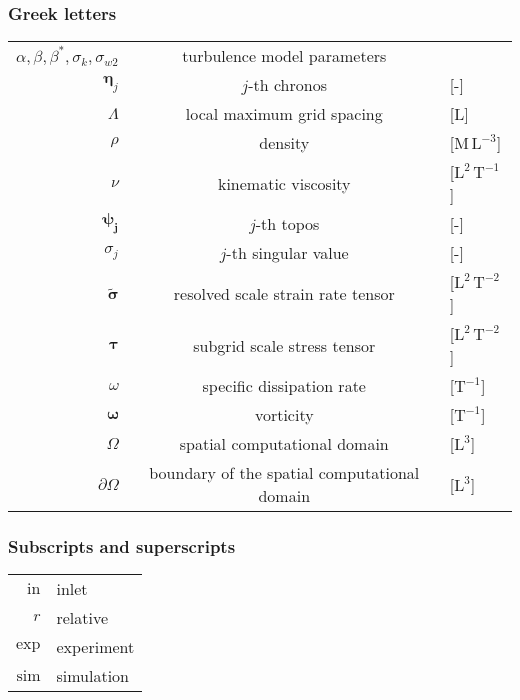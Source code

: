     \subsubsection*{Greek letters}
    \begin{tabular}{ rcl }
    $\alpha, {\beta}, \beta^*, \sigma_k, \sigma_{w2}$ & turbulence model parameters &\, \\
    $\bm{\eta}_j$ & $j$-th chronos & [-] \\
    $\Lambda$ & local maximum grid spacing & [{$\mathrm{L}$}] \\
    $\rho$ & density & [{$\mathrm{M\,L^{-3}}$}] \\
    $\nu$ & kinematic viscosity & [{$\mathrm{L^2\,T^{-1}}$}] \\
    ${\bm{\psi_j}}$ & $j$-th topos & [-] \\
    ${{\sigma_j}}$ & $j$-th singular value & [-] \\
    $\bm{\tilde{\sigma}}$ & resolved scale strain rate tensor & [$\mathrm{L^{2}\,T^{-2}}$] \\
    $\bm{{\tau}}$ & subgrid scale stress tensor & [$\mathrm{L^{2}\,T^{-2}}$] \\
    ${\omega}$ & specific dissipation rate & [$\mathrm{T^{-1}}$] \\
    $\bm{\omega}$ & vorticity & [$\mathrm{T^{-1}}$] \\
    ${\Omega}$ & spatial computational domain & [$\mathrm{L^{3}}$] \\
    ${\partial\Omega}$ & boundary of the spatial computational domain & [$\mathrm{L^{3}}$] \\
    \end{tabular}
    
\subsubsection*{Subscripts and superscripts}
\begin{tabular}{ rl}
    $\mathrm{in}$ & inlet \\
    $r$ & relative \\
    $\mathrm{exp}$ & experiment \\
    $\mathrm{sim}$ & simulation \\
    
\end{tabular}
    
